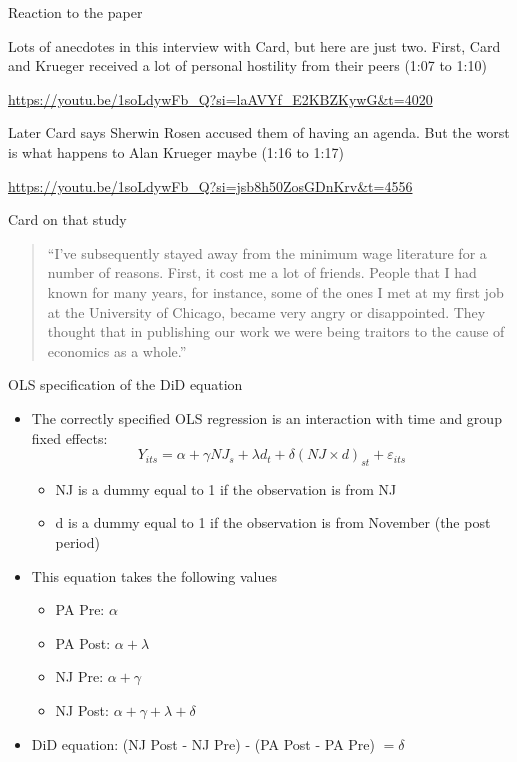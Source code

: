 \documentclass{beamer}
\begin{document}
\begin{frame}{Reaction to the paper}


Lots of anecdotes in this interview with Card, but here are just two.  First, Card and Krueger received a lot of personal hostility from their peers (1:07 to 1:10)

\bigskip

\url{https://youtu.be/1soLdywFb_Q?si=laAVYf_E2KBZKywG&t=4020}

\bigskip

Later Card says Sherwin Rosen accused them of having an agenda.  But the worst is what happens to Alan Krueger maybe (1:16 to 1:17)

\bigskip

\url{https://youtu.be/1soLdywFb_Q?si=jsb8h50ZosGDnKrv&t=4556}




\end{frame}

\begin{frame}{Card on that study}

\begin{quote}
``I’ve subsequently stayed away from the minimum wage literature for a number of reasons. First, it cost me a lot of friends. People that I had known for many years, for instance, some of the ones I met at my first job at the University of Chicago, became very angry or disappointed. They thought that in publishing our work we were being traitors to the cause of economics as a whole.''
\end{quote}


\end{frame}



\begin{frame}{OLS specification of the DiD equation}
	
	\begin{itemize}
	\item The correctly specified OLS regression is an interaction with time and group fixed effects:$$Y_{its} = \alpha + \gamma NJ_s + \lambda d_t + \delta (NJ \times d)_{st} + \varepsilon_{its}$$
		\begin{itemize}
		\item NJ is a dummy equal to 1 if the observation is from NJ
		\item d is a dummy equal to 1 if the observation is from November (the post period)
		\end{itemize}
	\item This equation takes the following values
		\begin{itemize}
		\item PA Pre: $\alpha$
		\item PA Post: $\alpha + \lambda$
		\item NJ Pre: $\alpha + \gamma$
		\item NJ Post: $\alpha + \gamma + \lambda + \delta$
		\end{itemize}
	\item DiD equation: (NJ Post - NJ Pre) - (PA Post - PA Pre) $= \delta$
	\end{itemize}
\end{frame}
\end{document}
